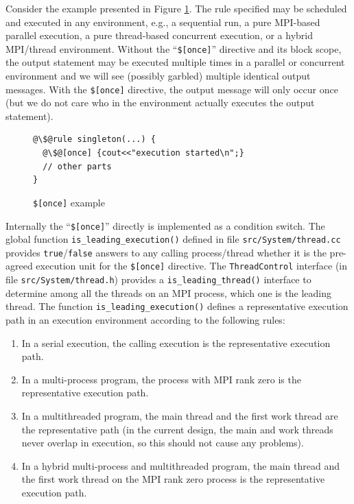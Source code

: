 \documentclass{article}
\begin{document}
Consider the example presented in Figure \ref{fig:once}.  The rule
specified may be scheduled and executed in any environment, e.g., a
sequential run, a pure MPI-based parallel execution, a pure thread-based
concurrent execution, or a hybrid MPI/thread environment.  Without the
``\texttt{\$[once]}'' directive and its block scope, the output
statement may be executed multiple times in a parallel or concurrent
environment and we will see (possibly garbled) multiple identical output
messages.  With the \texttt{\$[once]} directive, the output message will
only occur once (but we do not care who in the environment actually
executes the output statement).

\begin{figure}[h]
\begin{lstlisting}[escapechar=@]
@\$@rule singleton(...) {
  @\$@[once] {cout<<"execution started\n";}
  // other parts
}
\end{lstlisting}
\caption{\texttt{\$[once]} example\label{fig:once}}
\end{figure}

Internally the ``\texttt{\$[once]}'' directly is implemented as a
condition switch. The global function
\lstinline{is_leading_execution()} defined in file
\texttt{src/System/thread.cc} provides
\lstinline{true}/\lstinline{false} answers to any calling process/thread
whether it is the pre-agreed execution unit for the \texttt{\$[once]}
directive.  The \lstinline{ThreadControl} interface (in file
\texttt{src/System/thread.h}) provides a
\lstinline{is_leading_thread()} interface to determine among all the
threads on an MPI process, which one is the leading thread.  The
function \lstinline{is_leading_execution()} defines a representative
execution path in an execution environment according to the following
rules:

\begin{enumerate}
  \item In a serial execution, the calling execution is the
    representative execution path.
  \item In a multi-process program, the process with MPI rank zero is
    the representative execution path.
  \item In a multithreaded program, the main thread and the first work
    thread are the representative path (in the current design, the main
    and work threads never overlap in execution, so this should not cause
    any problems).
  \item In a hybrid multi-process and multithreaded program, the main
    thread and the first work thread on the MPI rank zero process is the
    representative execution path.
\end{enumerate}
\end{document}
